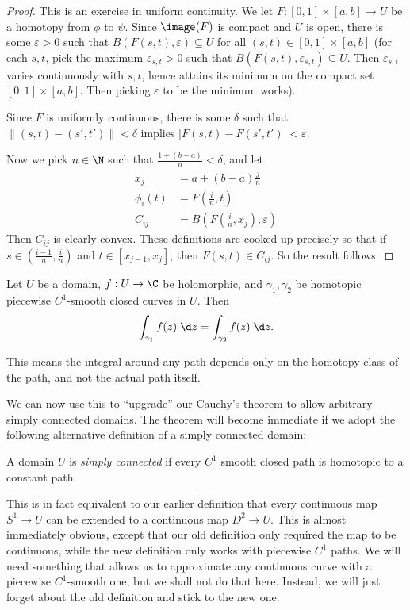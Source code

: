 \documentclass[a4paper]{article}
\begin{document}
\begin{proof}
  This is an exercise in uniform continuity. We let $F: [0, 1] \times [a, b] \to U$ be a homotopy from $\phi$ to $\psi$. Since $\image (F)$ is compact and $U$ is open, there is some $\varepsilon > 0$ such that $B(F(s, t), \varepsilon) \subseteq U$ for all $(s, t) \in [0, 1] \times [a, b]$ (for each $s, t$, pick the maximum $\varepsilon_{s, t} > 0$ such that $B(F(s, t), \varepsilon_{s, t}) \subseteq U$. Then $\varepsilon_{s, t}$ varies continuously with $s, t$, hence attains its minimum on the compact set $[0, 1] \times [a, b]$. Then picking $\varepsilon$ to be the minimum works).

  Since $F$ is uniformly continuous, there is some $\delta$ such that $\|(s, t) - (s', t')\| < \delta$ implies $|F(s, t) - F(s', t')| < \varepsilon$.

  Now we pick $n \in \N$ such that $\frac{1 + (b - a)}{n} < \delta$, and let
  \begin{align*}
    x_j &= a + (b - a) \frac{j}{n}\\
    \phi_i(t) &= F\left(\tfrac{i}{n}, t\right)\\
    C_{ij} &= B\left(F\left(\tfrac{i}{n}, x_j\right), \varepsilon\right)
  \end{align*}
  Then $C_{ij}$ is clearly convex. These definitions are cooked up precisely so that if $s \in \left(\frac{i - 1}{n}, \frac{i}{n}\right)$ and $t \in [x_{j - 1}, x_j]$, then $F(s, t) \in C_{ij}$. So the result follows.
\end{proof}

\begin{cor}
  Let $U$ be a domain, $f: U \to \C$ be holomorphic, and $\gamma_1, \gamma_2$ be homotopic piecewise $C^1$-smooth closed curves in $U$. Then
  \[
    \int_{\gamma_1}f(z)\;\d z = \int_{\gamma_2}f(z)\;\d z.
  \]
\end{cor}
This means the integral around any path depends only on the homotopy class of the path, and not the actual path itself.

We can now use this to ``upgrade'' our Cauchy's theorem to allow arbitrary simply connected domains. The theorem will become immediate if we adopt the following alternative definition of a simply connected domain:

\begin{defi}
  A domain $U$ is \emph{simply connected} if every $C^1$ smooth closed path is homotopic to a constant path.
\end{defi}
This is in fact equivalent to our earlier definition that every continuous map $S^1 \to U$ can be extended to a continuous map $D^2 \to U$. This is almost immediately obvious, except that our old definition only required the map to be continuous, while the new definition only works with piecewise $C^1$ paths. We will need something that allows us to approximate any continuous curve with a piecewise $C^1$-smooth one, but we shall not do that here. Instead, we will just forget about the old definition and stick to the new one.
\end{document}
